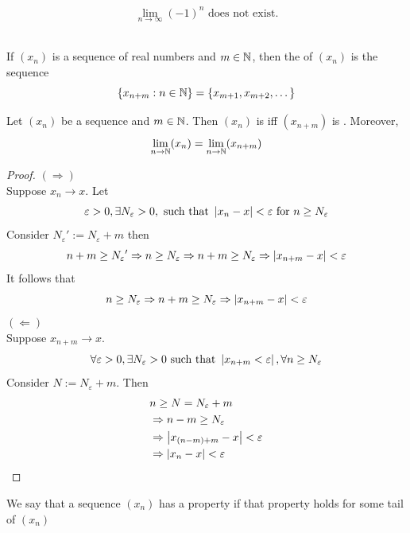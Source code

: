 \documentclass[a4paper,12pt]{article}
\begin{document}
\begin{remark}
    \[\lim_{n\to\infty}(-1)^n\text{ does not exist.}\]\\
\end{remark}

\begin{definition}
    If \((x_n)\) is a sequence of real numbers and \(m \in \mathbb{N}\), then the  of \((x_n)\) is the sequence 
    \[\{x_{n+m}:n\in\mathbb{N}\}=\{x_{m+1}, x_{m+2}, \dots\}\]
\end{definition}

\begin{theorem}
    Let \((x_n)\) be a sequence and \(m\in\mathbb{N}\). Then \((x_n)\) is  iff \((x_{n+m})\) is . 
    Moreover,\[\lim_{n\to\mathbb{N}}(x_n) = \lim_{n\to\mathbb{N}}(x_{n+m})\]
\end{theorem}

\begin{proof}
    \((\Rightarrow)\)\\
    Suppose \(x_n\to x\). Let\[\varepsilon>0, \exists N_\varepsilon >0, \text{ such that } \left\lvert x_n-x\right\rvert<\varepsilon \text{ for }n\ge N_\varepsilon\]
    Consider \({N_\varepsilon}':=N_\varepsilon + m\) then
    \[n+m \ge {N_\varepsilon}' \Rightarrow n\ge N_\varepsilon \Rightarrow n+m\ge N_\varepsilon \Rightarrow \left\lvert x_{n+m}-x\right\rvert<\varepsilon\]
    It follows that \[n\ge N_\varepsilon \Rightarrow n+m \ge N_\varepsilon \Rightarrow \left\lvert x_{n+m}-x\right\rvert<\varepsilon\]
    \newpage
    \((\Leftarrow)\)\\
    Suppose \(x_{n+m}\rightarrow x\).
    \[\forall \varepsilon>0,\exists N_\varepsilon>0 \text{ such that } \left\lvert x_{n+m}<\varepsilon\right\rvert, \forall n\ge N_\varepsilon\]
    Consider \(N:=N_\varepsilon+m\). Then 
    \begin{align*}
        & n\ge N = N_\varepsilon+m \\
        & \Rightarrow n-m \ge N_\varepsilon \\
        & \Rightarrow\left\lvert x_{(n-m)+m}-x\right\rvert<\varepsilon \\
        & \Rightarrow\left\lvert x_n-x\right\rvert<\varepsilon
    \end{align*}
\end{proof}

\begin{remark}
    We say that a sequence \((x_n)\)  has a property if that property holds for some tail of \((x_n)\)\\
\end{remark}
\end{document}
